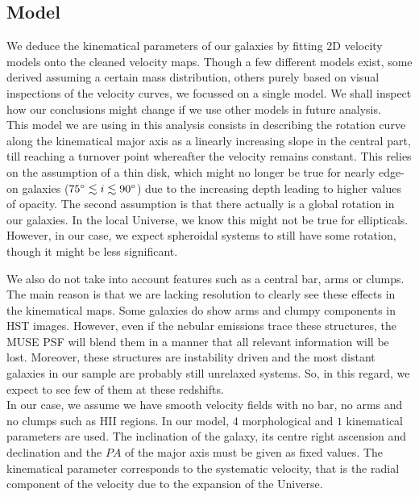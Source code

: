 \subsection{Model}
\label{subsec:model}

We deduce the kinematical parameters of our galaxies by fitting 2D velocity models onto the cleaned velocity maps. Though a few different models exist, some derived assuming a certain mass distribution, others purely based on visual inspections of the velocity curves, we focussed on a single model. We shall inspect how our conclusions might change if we use other models in future analysis. \\

This model we are using in this analysis consists in describing the rotation curve along the kinematical major axis as a linearly increasing slope in the central part, till reaching a turnover point whereafter the velocity remains constant. This relies on the assumption of a thin disk, which might no longer be true for nearly edge-on galaxies ($75 \degree \lesssim i \lesssim 90 \degree$) due to the increasing depth leading to higher values of opacity. The second assumption is that there actually is a global rotation in our galaxies. In the local Universe, we know this might not be true for ellipticals. However, in our case, we expect spheroidal systems to still have some rotation, though it might be less significant.

We also do not take into account features such as a central bar, arms or clumps. The main reason is that we are lacking resolution to clearly see these effects in the kinematical maps. Some galaxies do show arms and clumpy components in HST images. However, even if the nebular emissions trace these structures, the MUSE PSF will blend them in a manner that all relevant information will be lost. Moreover, these structures are instability driven and the most distant galaxies in our sample are probably still unrelaxed systems. So, in this regard, we expect to see few of them at these redshifts.\\

In our case, we assume we have smooth velocity fields with no bar, no arms and no clumps such as HII regions.
In our model, $4$ morphological and $1$ kinematical parameters are used. The inclination of the galaxy, its centre right ascension and declination and the $PA$ of the major axis must be given as fixed values. The kinematical parameter corresponds to the systematic velocity, that is the radial component of the velocity due to the expansion of the Universe.

